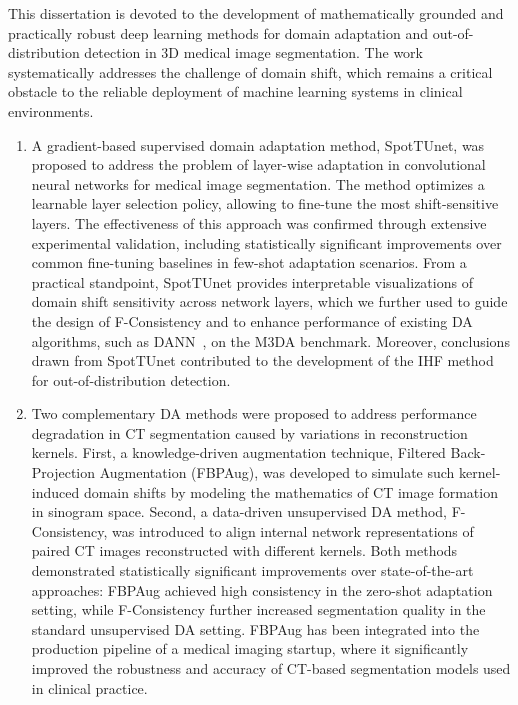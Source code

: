 This dissertation is devoted to the development of mathematically grounded and practically robust deep learning methods for domain adaptation and out-of-distribution detection in 3D medical image segmentation. The work systematically addresses the challenge of domain shift, which remains a critical obstacle to the reliable deployment of machine learning systems in clinical environments.

\begin{enumerate}
	
	\item A gradient-based supervised domain adaptation method, SpotTUnet, was proposed to address the problem of layer-wise adaptation in convolutional neural networks for medical image segmentation. The method optimizes a learnable layer selection policy, allowing to fine-tune the most shift-sensitive layers. The effectiveness of this approach was confirmed through extensive experimental validation, including statistically significant improvements over common fine-tuning baselines in few-shot adaptation scenarios. From a practical standpoint, SpotTUnet provides interpretable visualizations of domain shift sensitivity across network layers, which we further used to guide the design of F-Consistency and to enhance performance of existing DA algorithms, such as DANN~\cite{dann}, on the M3DA benchmark. Moreover, conclusions drawn from SpotTUnet contributed to the development of the IHF method for out-of-distribution detection.
	
	\item Two complementary DA methods were proposed to address performance degradation in CT segmentation caused by variations in reconstruction kernels. First, a knowledge-driven augmentation technique, Filtered Back-Projection Augmentation (FBPAug), was developed to simulate such kernel-induced domain shifts by modeling the mathematics of CT image formation in sinogram space. Second, a data-driven unsupervised DA method, F-Consistency, was introduced to align internal network representations of paired CT images reconstructed with different kernels. Both methods demonstrated statistically significant improvements over state-of-the-art approaches: FBPAug achieved high consistency in the zero-shot adaptation setting, while F-Consistency further increased segmentation quality in the standard unsupervised DA setting. FBPAug has been integrated into the production pipeline of a medical imaging startup, where it significantly improved the robustness and accuracy of CT-based segmentation models used in clinical practice.
	

\end{enumerate}
